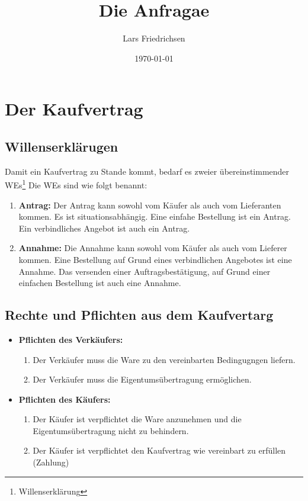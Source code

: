 \documentclass[a4paper,11pt]{scrartcl}	%
\title{Die Anfragae}
\author{Lars Friedrichsen}
\date{\today}
\begin{document}
\section{Der Kaufvertrag}

	\subsection{Willenserklärugen}
	Damit ein Kaufvertrag zu Stande kommt, bedarf es zweier übereinstimmender WEs\footnote{Willenserklärung}
	Die WEs sind wie folgt benannt:
	
	\begin{enumerate}
		\item \textbf{Antrag:} Der Antrag kann sowohl vom Käufer als auch vom Lieferanten kommen.
			Es ist situationsabhängig. Eine einfahe Bestellung ist ein Antrag. Ein verbindliches 
			Angebot ist auch ein Antrag.
		\item \textbf{Annahme:} Die Annahme kann sowohl  vom Käufer als auch vom Lieferer kommen. Eine Bestellung auf Grund
			eines verbindlichen Angebotes ist eine Annahme. Das versenden einer Auftragsbestätigung, auf Grund 
			einer einfachen Bestellung ist auch eine Annahme.
	\end{enumerate}

	\subsection{Rechte und Pflichten aus dem Kaufvertarg}

	\begin{itemize}
		\item \textbf{Pflichten des Verkäufers:}
			\begin{enumerate}
				\item Der Verkäufer muss die Ware zu den vereinbarten Bedingugngen liefern.
				\item Der Verkäufer muss die Eigentumsübertragung ermöglichen.
			\end{enumerate}
		\item \textbf{Pflichten des Käufers:}
			\begin{enumerate}
				\item Der Käufer ist verpflichtet die Ware anzunehmen und die Eigentumsübertragung
					nicht zu behindern.
				\item Der Käufer ist verpflichtet den Kaufvertrag wie vereinbart zu erfüllen (Zahlung)
			\end{enumerate}
	\end{itemize}
\end{document}
